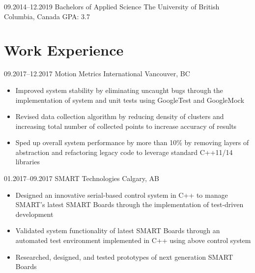 \documentclass[]{cv-style}          %
\begin{document}
\begin{entrylist}
\entry
{09.2014--12.2019}
{Bachelors {\normalfont of Applied Science}}
{The University of British Columbia, Canada}
{ {\hfill \normalfont GPA: 3.7}}
{\vspace{-0.3cm}}
\end{entrylist}


\section{Work Experience}

\begin{entrylist}
\entry
  {09.2017--12.2017}
  {Motion Metrics International}
  {Vancouver, BC}
  {
  \begin{itemize}[leftmargin=*]
    \item Improved system stability by eliminating uncaught bugs through the implementation of system and unit tests using GoogleTest and GoogleMock
    \item Revised data collection algorithm by reducing density of clusters and increasing total number of collected points to increase accuracy of results
    \item Sped up overall system performance by more than 10\% by removing layers of abstraction and refactoring legacy code to leverage standard C++11/14 libraries 
  \end{itemize}}
\entry
  {01.2017--09.2017}
  {SMART Technologies}
  {Calgary, AB}
  {
  \begin{itemize}[leftmargin=*]
    \item Designed an innovative serial-based control system in C++ to manage SMART's latest SMART Boards through the implementation of test-driven development
    \item Validated system functionality of latest SMART Boards through an automated test environment implemented in C++ using above control system
    \item Researched, designed, and tested prototypes of next generation SMART Boards
  \end{itemize}}

\end{entrylist}
\end{document}
